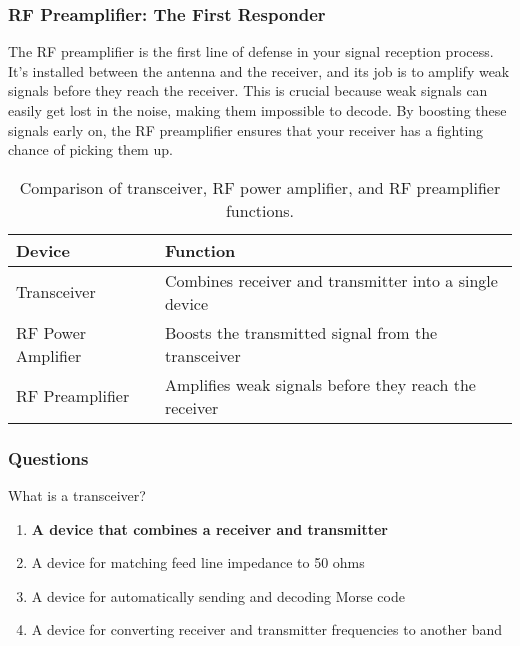 \subsubsection*{RF Preamplifier: The First Responder}
The RF preamplifier is the first line of defense in your signal reception process. It's installed between the antenna and the receiver, and its job is to amplify weak signals before they reach the receiver. This is crucial because weak signals can easily get lost in the noise, making them impossible to decode. By boosting these signals early on, the RF preamplifier ensures that your receiver has a fighting chance of picking them up.


\begin{table}[h!]
    \centering
    \begin{tabular}{|l|l|}
        \hline
        \textbf{Device} & \textbf{Function} \\
        \hline
        Transceiver & Combines receiver and transmitter into a single device \\
        RF Power Amplifier & Boosts the transmitted signal from the transceiver \\
        RF Preamplifier & Amplifies weak signals before they reach the receiver \\
        \hline
    \end{tabular}
    \caption{Comparison of transceiver, RF power amplifier, and RF preamplifier functions.}
    \label{tab:comparison-functions}
\end{table}

\subsubsection{Questions}

\begin{tcolorbox}[colback=gray!10!white,colframe=black!75!black,title={T7A02}]
    What is a transceiver?
    \begin{enumerate}[label=\Alph*),noitemsep]
        \item \textbf{A device that combines a receiver and transmitter}
        \item A device for matching feed line impedance to 50 ohms
        \item A device for automatically sending and decoding Morse code
        \item A device for converting receiver and transmitter frequencies to another band
    \end{enumerate}
\end{tcolorbox}

